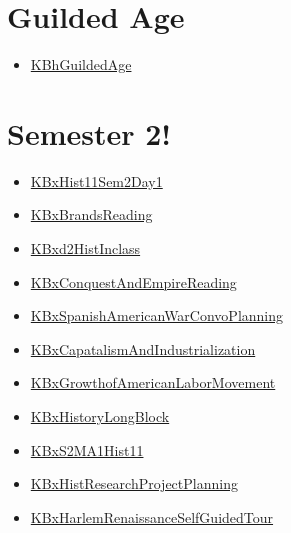 \documentclass[letterpaper]{article}
\begin{document}
\section{Guilded Age}
\label{sec:orgdb8c02e}
\begin{itemize}
\item \href{KBhGuildedAge.org}{KBhGuildedAge}
\end{itemize}

\section{Semester 2!}
\label{sec:org6979aa1}
\begin{itemize}
\item \href{KBxHist11Sem2Day1.org}{KBxHist11Sem2Day1}
\item \href{KBxBrandsReading.org}{KBxBrandsReading}
\item \href{KBxd2HistInclass.org}{KBxd2HistInclass}
\item \href{KBxConquestAndEmpireReading.org}{KBxConquestAndEmpireReading}
\item \href{KBxSpanishAmericanWarConvoPlanning.org}{KBxSpanishAmericanWarConvoPlanning}
\item \href{KBxCapatalismAndIndustrialization.org}{KBxCapatalismAndIndustrialization}
\item \href{KBxGrowthofAmericanLaborMovement.org}{KBxGrowthofAmericanLaborMovement}
\item \href{KBxHistoryLongBlock.org}{KBxHistoryLongBlock}
\item \href{KBxS2MA1Hist11.org}{KBxS2MA1Hist11}
\item \href{KBxHistResearchProjectPlanning.org}{KBxHistResearchProjectPlanning}
\item \href{KBxHarlemRenaissanceSelfGuidedTour.org}{KBxHarlemRenaissanceSelfGuidedTour}
\end{itemize}
\end{document}
